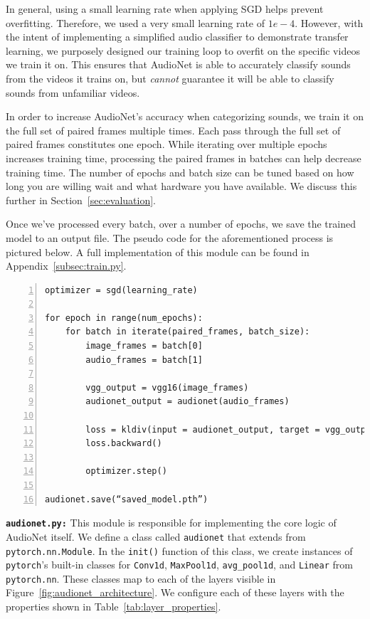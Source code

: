 \documentclass[12pt,twoside]{article}
\theoremstyle{plain}
\theoremstyle{definition}
\theoremstyle{remark}
\begin{document}
In general, using a small learning rate when applying SGD helps prevent overfitting.
Therefore, we used a very small learning rate of $1e-4$.
However, with the intent of implementing a simplified audio classifier to demonstrate transfer learning, we purposely designed our training loop to overfit on the specific videos we train it on.
This ensures that AudioNet is able to accurately classify sounds from the videos it trains on, but \textit{cannot} guarantee it will be able to classify sounds from unfamiliar videos.

In order to increase AudioNet’s accuracy when categorizing sounds, we train it on the full set of paired frames multiple times.
Each pass through the full set of paired frames constitutes one epoch.
While iterating over multiple epochs increases training time, processing the paired frames in batches can help decrease training time.
The number of epochs and batch size can be tuned based on how long you are willing wait and what hardware you have available.
We discuss this further in Section~\ref{sec:evaluation}.

Once we’ve processed every batch, over a number of epochs, we save the trained model to an output file.
The pseudo code for the aforementioned process is pictured below.
A full implementation of this module can be found in Appendix~\ref{subsec:train.py}.

{\setlength{\fboxsep}{10pt}
\begin{Verbatim}[frame=leftline, numbers=left, xleftmargin=5mm]
optimizer = sgd(learning_rate)

for epoch in range(num_epochs):
    for batch in iterate(paired_frames, batch_size):
        image_frames = batch[0]
        audio_frames = batch[1]

        vgg_output = vgg16(image_frames)
        audionet_output = audionet(audio_frames)

        loss = kldiv(input = audionet_output, target = vgg_output)
        loss.backward()

        optimizer.step()

audionet.save(“saved_model.pth”)
\end{Verbatim}
}

\bigskip
\noindent
\textbf{\texttt{audionet.py:}}
This module is responsible for implementing the core logic of AudioNet itself.
We define a class called \texttt{audionet} that extends from \texttt{pytorch.nn.Module}.
In the \texttt{init()} function of this class, we create instances of \texttt{pytorch}’s built-in classes for \texttt{Conv1d}, \texttt{MaxPool1d}, \texttt{avg\_pool1d}, and \texttt{Linear} from \texttt{pytorch.nn}.
These classes map to each of the layers visible in Figure~\ref{fig:audionet_architecture}.
We configure each of these layers with the properties shown in Table~\ref{tab:layer_properties}.
\end{document}
